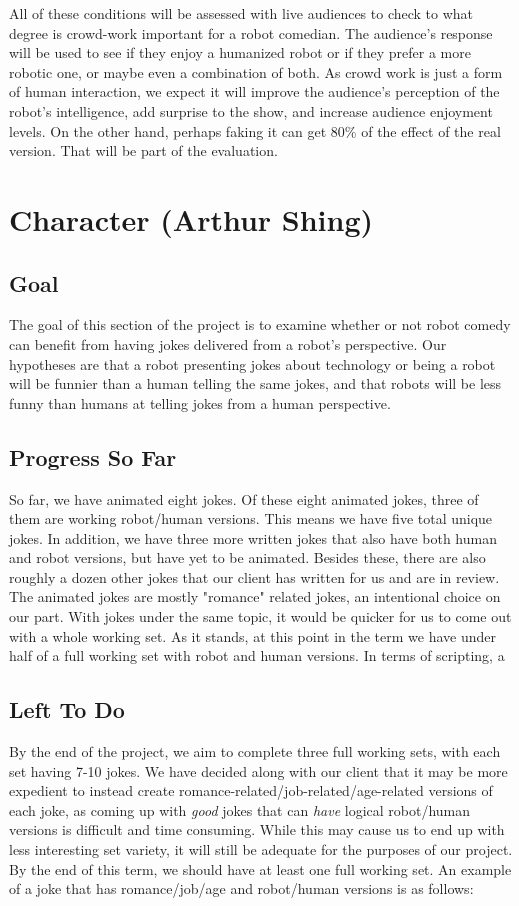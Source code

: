 \documentclass[onecolumn, draftclsnofoot,10pt, compsoc]{IEEEtran}
\begin{document}
All of these conditions will be assessed with live audiences to check to what degree is crowd-work important for a robot comedian. The audience's response will be used to see if they enjoy a humanized robot or if they prefer a more robotic one, or maybe even a combination of both. As crowd work is just a form of human interaction, we expect it will improve the audience's perception of the robot's intelligence, add surprise to the show, and increase audience enjoyment levels. On the other hand, perhaps faking it can get 80\% of the effect of the real version. That will be part of the evaluation.

\section{Character (Arthur Shing)}
\subsection{Goal}
The goal of this section of the project is to examine whether or not robot comedy can benefit from having jokes delivered from a robot's perspective. Our hypotheses are that a robot presenting jokes about technology or being a robot will be funnier than a human telling the same jokes, and that robots will be less funny than humans at telling jokes from a human perspective.
\subsection{Progress So Far}
So far, we have animated eight jokes. Of these eight animated jokes, three of them are working robot/human versions. This means we have five total unique jokes. In addition, we have three more written jokes that also have both human and robot versions, but have yet to be animated. Besides these, there are also roughly a dozen other jokes that our client has written for us and are in review. The animated jokes are mostly "romance" related jokes, an intentional choice on our part. With jokes under the same topic, it would be quicker for us to come out with a whole working set. As it stands, at this point in the term we have under half of a full working set with robot and human versions. In terms of scripting, a
\subsection{Left To Do}
By the end of the project, we aim to complete three full working sets, with each set having 7-10 jokes. We have decided along with our client that it may be more expedient to instead create romance-related/job-related/age-related versions of each joke, as coming up with \textit{good} jokes that can \textit{have} logical robot/human versions is difficult and time consuming. While this may cause us to end up with less interesting set variety, it will still be adequate for the purposes of our project. By the end of this term, we should have at least one full working set. An example of a joke that has romance/job/age and robot/human versions is as follows:
\end{document}
